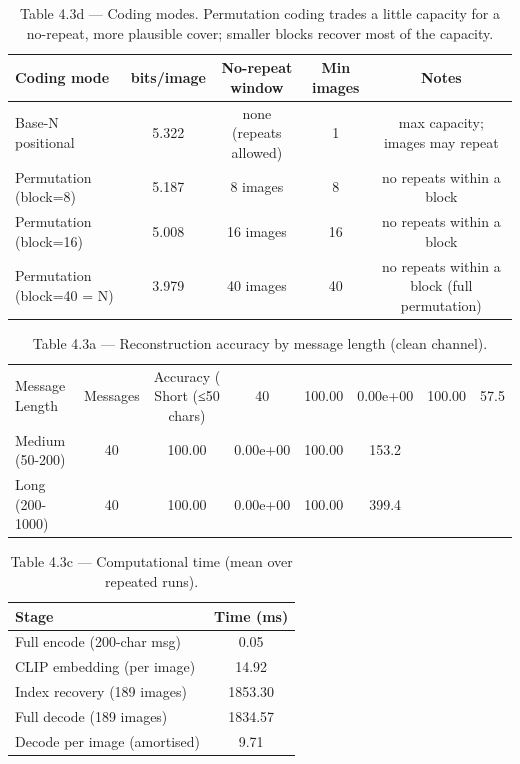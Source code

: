 \begin{table}[htbp]
\centering
\caption{Table 4.3d — Coding modes. Permutation coding trades a little capacity for a no-repeat, more plausible cover; smaller blocks recover most of the capacity.}
\label{tab:table_4_3_coding_modes}
\begin{tabular}{lcccc}
\hline
Coding mode & bits/image & No-repeat window & Min images & Notes \\
\hline
Base-N positional & 5.322 & none (repeats allowed) & 1 & max capacity; images may repeat \\
Permutation (block=8) & 5.187 & 8 images & 8 & no repeats within a block \\
Permutation (block=16) & 5.008 & 16 images & 16 & no repeats within a block \\
Permutation (block=40 = N) & 3.979 & 40 images & 40 & no repeats within a block (full permutation) \\
\hline
\end{tabular}
\end{table}


\begin{table}[htbp]
\centering
\caption{Table 4.3a — Reconstruction accuracy by message length (clean channel).}
\label{tab:table_4_3_reconstruction}
\begin{tabular}{lccccc}
\hline
Message Length & Messages & Accuracy (%
\hline
Short (≤50 chars) & 40 & 100.00 & 0.00e+00 & 100.00 & 57.5 \\
Medium (50-200) & 40 & 100.00 & 0.00e+00 & 100.00 & 153.2 \\
Long (200-1000) & 40 & 100.00 & 0.00e+00 & 100.00 & 399.4 \\
\hline
\end{tabular}
\end{table}


\begin{table}[htbp]
\centering
\caption{Table 4.3c — Computational time (mean over repeated runs).}
\label{tab:table_4_3_timing}
\begin{tabular}{lc}
\hline
Stage & Time (ms) \\
\hline
Full encode (200-char msg) & 0.05 \\
CLIP embedding (per image) & 14.92 \\
Index recovery (189 images) & 1853.30 \\
Full decode (189 images) & 1834.57 \\
Decode per image (amortised) & 9.71 \\
\hline
\end{tabular}
\end{table}


